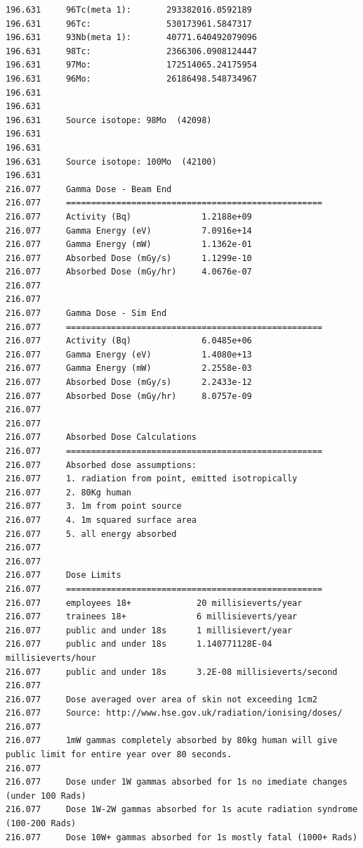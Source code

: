 \begin{lstlisting}[style=sOutputFile,caption={Final results for Molybdenum Irradiation},label={listing:activityv2iron}]
196.631     96Tc(meta 1):       293382016.0592189
196.631     96Tc:               530173961.5847317
196.631     93Nb(meta 1):       40771.640492079096
196.631     98Tc:               2366306.0908124447
196.631     97Mo:               172514065.24175954
196.631     96Mo:               26186498.548734967
196.631     
196.631     
196.631     Source isotope: 98Mo  (42098)
196.631     
196.631     
196.631     Source isotope: 100Mo  (42100)
196.631     
216.077     Gamma Dose - Beam End  
216.077     ===================================================
216.077     Activity (Bq)              1.2188e+09  
216.077     Gamma Energy (eV)          7.0916e+14    
216.077     Gamma Energy (mW)          1.1362e-01   
216.077     Absorbed Dose (mGy/s)      1.1299e-10    
216.077     Absorbed Dose (mGy/hr)     4.0676e-07                
216.077     
216.077     
216.077     Gamma Dose - Sim End
216.077     ===================================================
216.077     Activity (Bq)              6.0485e+06
216.077     Gamma Energy (eV)          1.4080e+13    
216.077     Gamma Energy (mW)          2.2558e-03     
216.077     Absorbed Dose (mGy/s)      2.2433e-12     
216.077     Absorbed Dose (mGy/hr)     8.0757e-09   
216.077     
216.077     
216.077     Absorbed Dose Calculations
216.077     ===================================================
216.077     Absorbed dose assumptions:
216.077     1. radiation from point, emitted isotropically
216.077     2. 80Kg human
216.077     3. 1m from point source
216.077     4. 1m squared surface area
216.077     5. all energy absorbed
216.077     
216.077     
216.077     Dose Limits
216.077     ===================================================
216.077     employees 18+             20 millisieverts/year
216.077     trainees 18+              6 millisieverts/year
216.077     public and under 18s      1 millisievert/year
216.077     public and under 18s      1.140771128E-04 millisieverts/hour
216.077     public and under 18s      3.2E-08 millisieverts/second
216.077     
216.077     Dose averaged over area of skin not exceeding 1cm2
216.077     Source: http://www.hse.gov.uk/radiation/ionising/doses/
216.077     
216.077     1mW gammas completely absorbed by 80kg human will give public limit for entire year over 80 seconds.
216.077     
216.077     Dose under 1W gammas absorbed for 1s no imediate changes (under 100 Rads)
216.077     Dose 1W-2W gammas absorbed for 1s acute radiation syndrome (100-200 Rads)
216.077     Dose 10W+ gammas absorbed for 1s mostly fatal (1000+ Rads)
\end{lstlisting}



